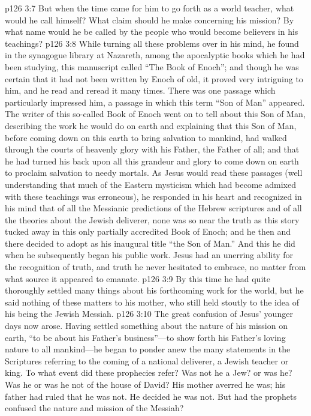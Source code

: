 \vs p126 3:7 But when the time came for him to go forth as a world teacher, what would he call himself? What claim should he make concerning his mission? By what name would he be called by the people who would become believers in his teachings?
\pc \vs p126 3:8 While turning all these problems over in his mind, he found in the synagogue library at Nazareth, among the apocalyptic books which he had been studying, this manuscript called “The Book of Enoch”; and though he was certain that it had not been written by Enoch of old, it proved very intriguing to him, and he read and reread it many times. There was one passage which particularly impressed him, a passage in which this term “Son of Man” appeared. The writer of this so\hyp{}called Book of Enoch went on to tell about this Son of Man, describing the work he would do on earth and explaining that this Son of Man, before coming down on this earth to bring salvation to mankind, had walked through the courts of heavenly glory with his Father, the Father of all; and that he had turned his back upon all this grandeur and glory to come down on earth to proclaim salvation to needy mortals. As Jesus would read these passages (well understanding that much of the Eastern mysticism which had become admixed with these teachings was erroneous), he responded in his heart and recognized in his mind that of all the Messianic predictions of the Hebrew scriptures and of all the theories about the Jewish deliverer, none was so near the truth as this story tucked away in this only partially accredited Book of Enoch; and he then and there decided to adopt as his inaugural title “the Son of Man.” And this he did when he subsequently began his public work. Jesus had an unerring ability for the recognition of truth, and truth he never hesitated to embrace, no matter from what source it appeared to emanate.
\vs p126 3:9 By this time he had quite thoroughly settled many things about his forthcoming work for the world, but he said nothing of these matters to his mother, who still held stoutly to the idea of his being the Jewish Messiah.
\vs p126 3:10 The great confusion of Jesus’ younger days now arose. Having settled something about the nature of his mission on earth, “to be about his Father’s business”---to show forth his Father’s loving nature to all mankind---he began to ponder anew the many statements in the Scriptures referring to the coming of a national deliverer, a Jewish teacher or king. To what event did these prophecies refer? Was not he a Jew? or was he? Was he or was he not of the house of David? His mother averred he was; his father had ruled that he was not. He decided he was not. But had the prophets confused the nature and mission of the Messiah?
